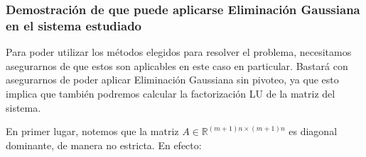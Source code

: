 \documentclass[11pt, a4paper, spanish]{article}
\theoremstyle{plain}
\theoremstyle{remark}
\begin{document}
    \subsubsection*{Demostración de que puede aplicarse Eliminación Gaussiana en el sistema estudiado}

      Para poder utilizar los métodos elegidos para resolver el problema, necesitamos asegurarnos de que estos son aplicables en este caso en particular. Bastará con asegurarnos de poder aplicar Eliminación Gaussiana sin pivoteo, ya que esto implica que también podremos calcular la factorización LU de la matriz del sistema.\cite[p.~403]{burden}

      En primer lugar, notemos que la matriz $A \in \mathbb{R}^{(m+1)n \times (m+1)n}$ es diagonal dominante, de manera no estricta. En efecto:
\end{document}
